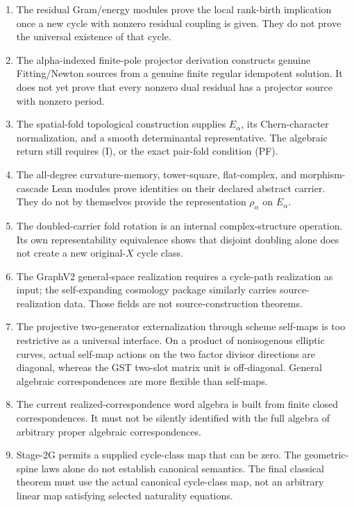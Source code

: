 \begin{enumerate}
\item The residual Gram/energy modules prove the local rank-birth implication once a new cycle with nonzero residual coupling is given. They do not prove the universal existence of that cycle.
\item The alpha-indexed finite-pole projector derivation constructs genuine Fitting/Newton sources from a genuine finite regular idempotent solution. It does not yet prove that every nonzero dual residual has a projector source with nonzero period.
\item The spatial-fold topological construction supplies \(E_\alpha\), its Chern-character normalization, and a smooth determinantal representative. The algebraic return still requires (I), or the exact pair-fold condition (PF).
\item The all-degree curvature-memory, tower-square, flat-complex, and morphism-cascade Lean modules prove identities on their declared abstract carrier. They do not by themselves provide the representation \(\rho_\alpha\) on \(E_\alpha\).
\item The doubled-carrier fold rotation is an internal complex-structure operation. Its own representability equivalence shows that disjoint doubling alone does not create a new original-\(X\) cycle class.
\item The GraphV2 general-space realization requires a cycle-path realization as input; the self-expanding cosmology package similarly carries source-realization data. Those fields are not source-construction theorems.
\item The projective two-generator externalization through scheme self-maps is too restrictive as a universal interface. On a product of nonisogenous elliptic curves, actual self-map actions on the two factor divisor directions are diagonal, whereas the GST two-slot matrix unit is off-diagonal. General algebraic correspondences are more flexible than self-maps.
\item The current realized-correspondence word algebra is built from finite closed correspondences. It must not be silently identified with the full algebra of arbitrary proper algebraic correspondences.
\item Stage-2G permits a supplied cycle-class map that can be zero. The geometric-spine laws alone do not establish canonical semantics. The final classical theorem must use the actual canonical cycle-class map, not an arbitrary linear map satisfying selected naturality equations.
\end{enumerate}

